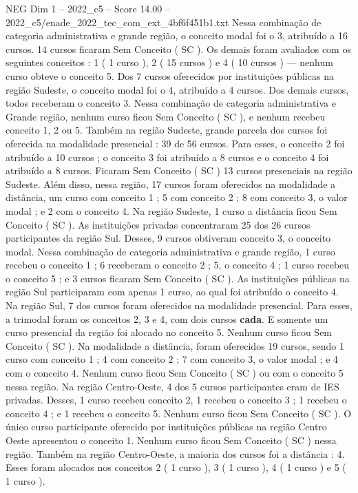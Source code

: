 \begin{textsample}{NEG Dim 1 – 2022\_c5 – Score 14.00 – 2022\_c5/enade\_2022\_tec\_com\_ext\_4bf6f451b1.txt}
Nessa combinação de categoria administrativa e grande região, o conceito modal foi o 3, atribuído a 16 cursos. 14 cursos ficaram Sem Conceito ( SC ).
Os demais foram avaliados com os seguintes conceitos : 1 ( 1 curso ), 2 ( 15 cursos ) e 4 ( 10 cursos ) — nenhum curso obteve o conceito 5.
Dos 7 cursos oferecidos por instituições públicas na região Sudeste, o conceito modal foi o 4, atribuído a 4 cursos.
Dos demais cursos, todos receberam o conceito 3.
Nessa combinação de categoria administrativa e Grande região, nenhum curso ficou Sem Conceito ( SC ), e nenhum recebeu conceito 1, 2 ou 5.
Também na região Sudeste, grande parcela dos cursos foi oferecida na modalidade presencial : 39 de 56 cursos.
Para esses, o conceito 2 foi atribuído a 10 cursos ; o conceito 3 foi atribuído a 8 cursos e o conceito 4 foi atribuído a 8 cursos.
Ficaram Sem Conceito ( SC ) 13 cursos presenciais na região Sudeste.
Além disso, nessa região, 17 cursos foram oferecidos na modalidade a distância, um curso com conceito 1 ; 5 com conceito 2 ; 8 com conceito 3, o valor modal ; e 2 com o conceito 4.
Na região Sudeste, 1 curso a distância ficou Sem Conceito ( SC ).
As instituições privadas concentraram 25 dos 26 cursos participantes da região Sul.
Desses, 9 cursos obtiveram conceito 3, o conceito modal.
Nessa combinação de categoria administrativa e grande região, 1 curso recebeu o conceito 1 ; 6 receberam o conceito 2 ; 5, o conceito 4 ; 1 curso recebeu o conceito 5 ; e 3 cursos ficaram Sem Conceito ( SC ).
As instituições públicas na região Sul participaram com apenas 1 curso, ao qual foi atribuído o conceito 4.
Na região Sul, 7 dos cursos foram oferecidos na modalidade presencial.
Para esses, a trimodal foram os conceitos 2, 3 e 4, com dois cursos \textbf{cada}.
E somente um curso presencial da região foi alocado no conceito 5.
Nenhum curso ficou Sem Conceito ( SC ).
Na modalidade a distância, foram oferecidos 19 cursos, sendo 1 curso com conceito 1 ; 4 com conceito 2 ; 7 com conceito 3, o valor modal ; e 4 com o conceito 4.
Nenhum curso ficou Sem Conceito ( SC ) ou com o conceito 5 nessa região.
Na região Centro-Oeste, 4 dos 5 cursos participantes eram de IES privadas.
Desses, 1 curso recebeu conceito 2, 1 recebeu o conceito 3 ; 1 recebeu o conceito 4 ; e 1 recebeu o conceito 5.
Nenhum curso ficou Sem Conceito ( SC ).
O único curso participante oferecido por instituições públicas na região Centro Oeste apresentou o conceito 1.
Nenhum curso ficou Sem Conceito ( SC ) nessa região.
Também na região Centro-Oeste, a maioria dos cursos foi a distância : 4.
Esses foram alocados nos conceitos 2 ( 1 curso ), 3 ( 1 curso ), 4 ( 1 curso ) e 5 ( 1 curso ).

\end{textsample}
